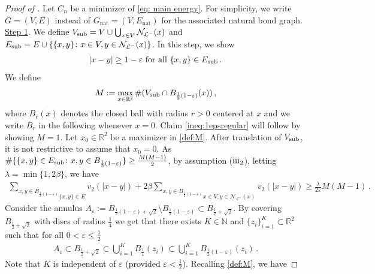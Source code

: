 \documentclass[reqno]{amsart}
\newcommand{\eps}{\varepsilon}
\theoremstyle{plain}
\newenvironment{step}[1]{\underline{Step #1}.}{}
\theoremstyle{definition}
\numberwithin{equation}{section}
\newcommand{\R}{\mathbb{R}}
\begin{document}
\begin{proof}[Proof of ] Let $C_n$ be a minimizer of \eqref{eq: main energy}. For simplicity, we write $G=(V,E)$ instead of $G_{\mathrm{nat}}=(V,E_{\mathrm{nat}})$ for the associated natural bond graph.   \\
\noindent \begin{step}{1}
 We define $V_{\rm sub} = V \cup \bigcup_{x\in V}  \mathcal{N}_{\mathcal{L}^-}(x)$ and $E_{\rm sub} = E \cup \lbrace \lbrace x,y \rbrace \colon x \in V, y\in \mathcal{N}_{\mathcal{L}^-}(x) \rbrace$.  In this step, we show
\begin{align}\label{ineq:1epsregular}
|x-y| \ge  1-\varepsilon \text{ for all }  \lbrace x,y \rbrace \in E_{\rm sub}\,. 
\end{align}
 We define  
\begin{align}\label{def:M}
M:= \max_{x \in \mathbb{R}^2} \#(V_{\rm sub}   \cap B_{\frac{1}{2}(1-\varepsilon)}(x))\,,
\end{align}
 where $B_r(x)$ denotes the closed ball with radius $r>0$ centered at $x$ and we write $B_r$ in the following whenever $x=0$.     Claim \eqref{ineq:1epsregular} will follow by showing  $M=1$. Let $ x_0 \in \R^2$ be a maximizer in \eqref{def:M}. After translation of $V_{\rm sub}$, it is not restrictive to  assume  that $x_0=0$.   As $\#\{\{x,y\} \in E_{\rm sub} \colon x,y \in B_{\frac{1}{2}(1-\varepsilon)}\} \geq \frac{M(M-1)}{2}$, by assumption {\rm ($\rm{iii}_2$)}, letting $\lambda = \min\{1, 2  \beta\}$,  we have 
\begin{align}\label{estimate:insideBall}
\underset{\{x,y\} \in E}{\sum_{x,y \in B_{\frac{1}{2}(1-\varepsilon)}}} v_2(|x-y|) +  2  \beta  \underset{x \in V, y\in \mathcal{N}_{\mathcal{L}^-}(x) }{\sum_{x,y\in  B_{\frac{1}{2}(1-\varepsilon)} }}  v_2(|x-y|)   \geq \frac{\lambda}{2\varepsilon}M(M-1)\,.
\end{align}
Consider the annulus $ A_\eps :=B_{\frac{1}{2}(1-\varepsilon) +\sqrt{2}} \setminus B_{\frac{1}{2}(1-\varepsilon)} \subset B_{\frac{1}{2}+\sqrt{2}}$. By covering $B_{\frac{1}{2}+\sqrt{2}}$ with discs of radius $\frac{1}{4}$ we get that there exists $ K \in  \mathbb{N}$ and $\{z_i\}_{i=1}^{K} \subset \mathbb{R}^2$ such that  for all $0 < \eps \le \frac{1}{2}$ 
\begin{align*}
A_\eps  \subset B_{\frac{1}{2}+\sqrt{2}}  \subset  \bigcup_{i=1}^{K} B_{\frac{1}{4}}(z_i)   \subset \bigcup_{i=1}^{K} B_{\frac{1}{2}(1-\varepsilon)}(z_i)\,.
\end{align*}
Note that $K$ is independent of $\varepsilon$ (provided $\varepsilon <\frac{1}{2}$). Recalling \eqref{def:M}, we have

\end{step}
\end{proof}
\end{document}
